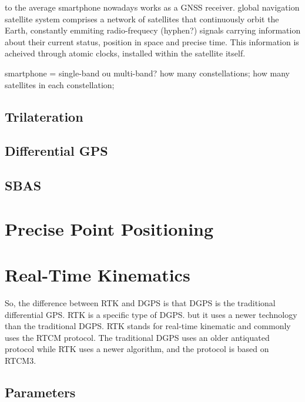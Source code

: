 to the average smartphone nowadays works as a GNSS receiver.
global navigation satellite system comprises a network of satellites that continuously orbit the Earth, constantly emmiting radio-frequecy (hyphen?) signals carrying information about their current status, position in space and precise time.
This information is acheived through atomic clocks, installed within the satellite itself.

smartphone = single-band ou multi-band?
how many constellations;
how many satellites in each constellation;

\subsection{Trilateration}\label{sec:II_gnss_trilateration}

\subsection{Differential GPS}\label{sec:II_gnss_dgps}

\subsection{SBAS}\label{sec:II_gnss_sbas}

\section{Precise Point Positioning}\label{sec:II_ppp}

\section{Real-Time Kinematics}\label{sec:II_rtk}

So, the difference between RTK and DGPS is that DGPS is the traditional differential GPS.
RTK is a specific type of DGPS.
but it uses a newer technology than the traditional DGPS.
RTK stands for real-time kinematic and commonly uses the RTCM protocol.
The traditional DGPS uses an older antiquated protocol while RTK uses a newer algorithm, and the protocol is based on RTCM3. 

\subsection{Parameters}\label{sec:II_rtk_parameters}

